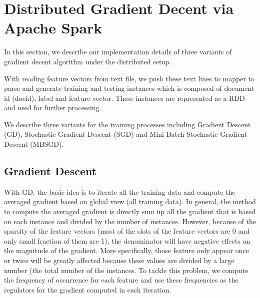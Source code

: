 \documentclass[sigconf]{acmart}
\begin{document}
\section{Distributed Gradient Decent via Apache Spark}
\label{sec:implementation}

In this section, we describe our implementation details of three variants of gradient decent algorithm under the distributed setup. 

With reading feature vectors from text file, we push these text lines to mapper to parse and generate training and testing instances which is composed of document id (docid), label and feature vector. These instances are represented as a RDD and used for further processing. 

We describe three variants for the training processes including Gradient Descent (GD), Stochastic Gradient Descent (SGD) and Mini-Batch Stochastic Gradient Descent (MBSGD).

\subsection{Gradient Descent}
\label{sec:implementationGD}

With GD, the basic idea is to iterate all the training data and compute the averaged gradient based on global view (all training data). In general, the method to compute the averaged gradient is directly sum up all the gradient that is based on each instance and divided by the number of instances. However, because of the sparsity of the feature vectors (most of the slots of the feature vectors are 0 and only small fraction of them are 1), the denominator will have negative effects on the magnitude of the gradient. More specifically, those feature only appear once or twice will be greatly affected because these values are divided by a large number (the total number of the instances. To tackle this problem, we compute the frequency of occurrence for each feature and use these frequencies as the regulators for the gradient computed in each iteration.
\end{document}
